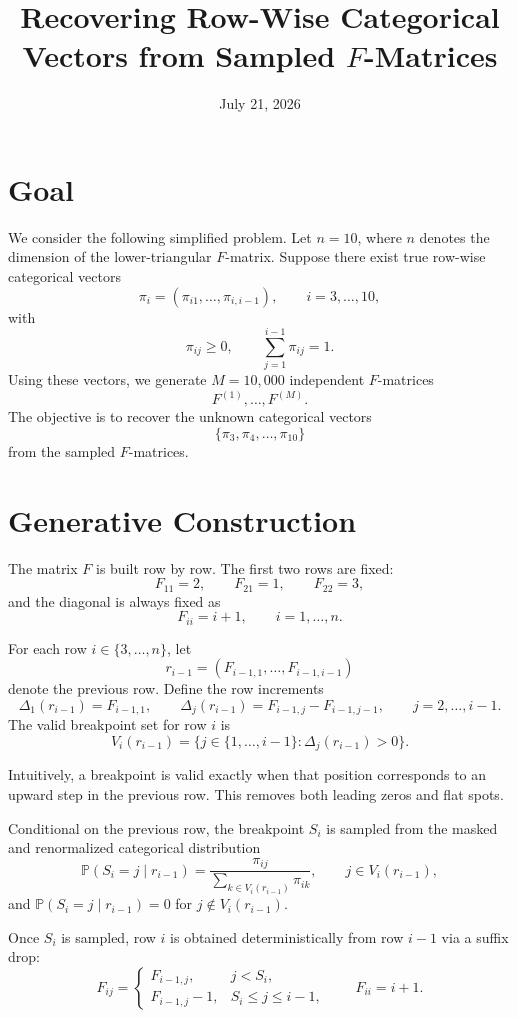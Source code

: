 \documentclass[11pt]{article}
\title{Recovering Row-Wise Categorical Vectors from Sampled $F$-Matrices}
\author{}
\date{July 21, 2026}
\begin{document}
\maketitle

\section{Goal}

We consider the following simplified problem. Let $n = 10$, where $n$ denotes the
dimension of the lower-triangular $F$-matrix. Suppose there exist true row-wise
categorical vectors
\[
\pi_i = (\pi_{i1}, \ldots, \pi_{i,i-1}), \qquad i = 3, \ldots, 10,
\]
with
\[
\pi_{ij} \ge 0,
\qquad
\sum_{j=1}^{i-1} \pi_{ij} = 1.
\]
Using these vectors, we generate $M = 10{,}000$ independent $F$-matrices
\[
F^{(1)}, \ldots, F^{(M)}.
\]
The objective is to recover the unknown categorical vectors
\[
\{\pi_3, \pi_4, \ldots, \pi_{10}\}
\]
from the sampled $F$-matrices.

\section{Generative Construction}

The matrix $F$ is built row by row. The first two rows are fixed:
\[
F_{11} = 2,
\qquad
F_{21} = 1,
\qquad
F_{22} = 3,
\]
and the diagonal is always fixed as
\[
F_{ii} = i+1, \qquad i = 1, \ldots, n.
\]

For each row $i \in \{3, \ldots, n\}$, let
\[
r_{i-1} = (F_{i-1,1}, \ldots, F_{i-1,i-1})
\]
denote the previous row. Define the row increments
\[
\Delta_1(r_{i-1}) = F_{i-1,1},
\qquad
\Delta_j(r_{i-1}) = F_{i-1,j} - F_{i-1,j-1},
\qquad j = 2, \ldots, i-1.
\]
The valid breakpoint set for row $i$ is
\[
V_i(r_{i-1})
=
\{j \in \{1, \ldots, i-1\} : \Delta_j(r_{i-1}) > 0\}.
\]

Intuitively, a breakpoint is valid exactly when that position corresponds to an
upward step in the previous row. This removes both leading zeros and flat spots.

Conditional on the previous row, the breakpoint $S_i$ is sampled from the masked
and renormalized categorical distribution
\[
\mathbb{P}(S_i = j \mid r_{i-1})
=
\frac{\pi_{ij}}{\sum_{k \in V_i(r_{i-1})} \pi_{ik}},
\qquad j \in V_i(r_{i-1}),
\]
and $\mathbb{P}(S_i = j \mid r_{i-1}) = 0$ for $j \notin V_i(r_{i-1})$.

Once $S_i$ is sampled, row $i$ is obtained deterministically from row $i-1$ via
a suffix drop:
\[
F_{ij} =
\begin{cases}
F_{i-1,j}, & j < S_i, \\
F_{i-1,j} - 1, & S_i \le j \le i-1,
\end{cases}
\qquad
F_{ii} = i+1.
\]
\end{document}
